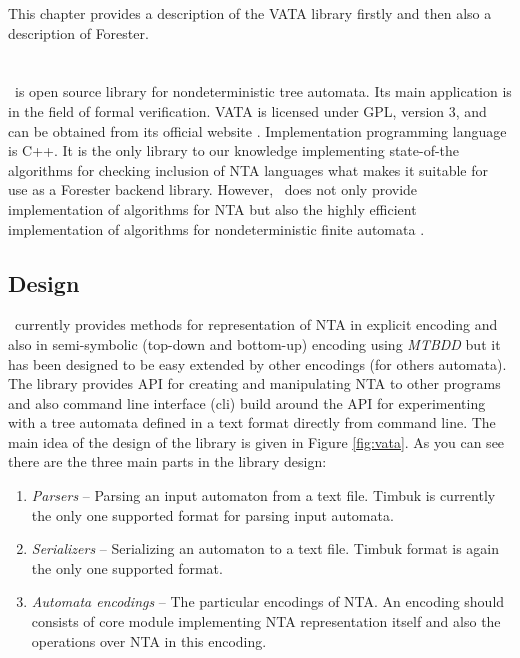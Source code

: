 This chapter provides a description of the VATA library firstly and then also a description of Forester.

\section{\Vata}
\label{sec:VATA}

\Vata\ is open source library for nondeterministic tree automata.
Its main application is in the field of formal verification.
VATA is licensed under GPL, version 3, and can be obtained from its official website \cite{www:libvata}.
Implementation programming language is C++.
It is the only library to our knowledge implementing state-of-the algorithms for checking inclusion of NTA languages
what makes it suitable for use as a Forester backend library.
However, \vata\ does not only provide implementation of algorithms for NTA but also the highly efficient implementation of
algorithms for nondeterministic finite automata \cite{bt:hruska}.

\subsection{Design}
\Vata\ currently provides methods for representation of NTA in explicit encoding and also in semi-symbolic (top-down and bottom-up)
encoding using \emph{MTBDD} but it has been designed to be easy extended by other encodings (for others automata).
The library provides API for creating and manipulating NTA to other programs and also command line interface (cli) build around
the API for experimenting with a tree automata defined in a text format directly from command line.
The main idea of the design of the library is given in Figure \ref{fig:vata}.
As you can see there are the three main parts in the library design:
\begin{enumerate}
	\item \emph{Parsers} -- Parsing an input automaton from a text file.
		Timbuk \cite{timbuk} is currently the only one supported format for parsing input automata.
	\item \emph{Serializers} -- Serializing an automaton to a text file.
		Timbuk format is again the only one supported format.
	\item \emph{Automata encodings} -- The particular encodings of NTA.
		An encoding should consists of core module implementing NTA representation itself
		and also the operations over NTA in this encoding.
\end{enumerate}

